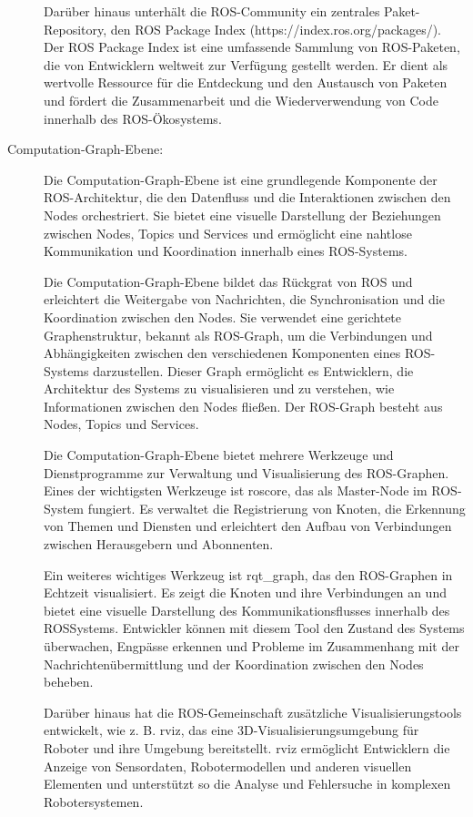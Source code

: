 \begin{description}
    Darüber hinaus unterhält die \ac{ROS}-Community ein zentrales Paket-Repository, den \ac{ROS} Package Index (https://index.ros.org/packages/). Der \ac{ROS} Package Index ist eine umfassende Sammlung von \ac{ROS}-Paketen, die von Entwicklern weltweit zur Verfügung gestellt werden. Er dient als wertvolle Ressource für die Entdeckung und den Austausch von Paketen und fördert die Zusammenarbeit und die Wiederverwendung von Code innerhalb des \ac{ROS}-Ökosystems.
    
    \cite[vgl.][]{filesystem}
    
    
    \item[Computation-Graph-Ebene:] Die Computation-Graph-Ebene ist eine grundlegende Komponente der \ac{ROS}-Architektur, die den Datenfluss und die Interaktionen zwischen den Nodes orchestriert. Sie bietet eine visuelle Darstellung der Beziehungen zwischen Nodes, Topics und Services und ermöglicht eine nahtlose Kommunikation und Koordination innerhalb eines \ac{ROS}-Systems.

    Die Computation-Graph-Ebene bildet das Rückgrat von \ac{ROS} und erleichtert die Weitergabe von Nachrichten, die Synchronisation und die Koordination zwischen den Nodes. Sie verwendet eine gerichtete Graphenstruktur, bekannt als ROS-Graph, um die Verbindungen und Abhängigkeiten zwischen den verschiedenen Komponenten eines \ac{ROS}-Systems darzustellen. Dieser Graph ermöglicht es Entwicklern, die Architektur des Systems zu visualisieren und zu verstehen, wie Informationen zwischen den Nodes fließen. Der ROS-Graph besteht aus Nodes, Topics und Services.
    
    Die Computation-Graph-Ebene bietet mehrere Werkzeuge und Dienstprogramme zur Verwaltung und Visualisierung des ROS-Graphen. Eines der wichtigsten Werkzeuge ist roscore, das als Master-Node im ROS-System fungiert. Es verwaltet die Registrierung von Knoten, die Erkennung von Themen und Diensten und erleichtert den Aufbau von Verbindungen zwischen Herausgebern und Abonnenten.
    
    Ein weiteres wichtiges Werkzeug ist rqt\_graph, das den ROS-Graphen in Echtzeit visualisiert. Es zeigt die Knoten und ihre Verbindungen an und bietet eine visuelle Darstellung des Kommunikationsflusses innerhalb des \ac{ROS}Systems. Entwickler können mit diesem Tool den Zustand des Systems überwachen, Engpässe erkennen und Probleme im Zusammenhang mit der Nachrichtenübermittlung und der Koordination zwischen den Nodes beheben. \cite[vgl.][]{rqt-graph}
    
    Darüber hinaus hat die \ac{ROS}-Gemeinschaft zusätzliche Visualisierungstools entwickelt, wie z. B. rviz, das eine 3D-Visualisierungsumgebung für Roboter und ihre Umgebung bereitstellt. rviz ermöglicht Entwicklern die Anzeige von Sensordaten, Robotermodellen und anderen visuellen Elementen und unterstützt so die Analyse und Fehlersuche in komplexen Robotersystemen.
    

\end{description}
